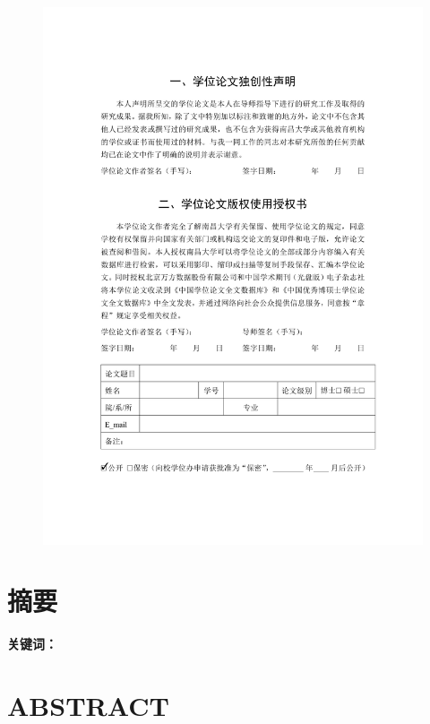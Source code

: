 \documentclass[UTF-8, a4paper, zihao=-4, no-math, openany, oneside]{ctexbook}
\begin{document}
\begin{figure}[H]
\centering
\includegraphics[width=\textwidth]{degree_thesis_declarations_authorizations}
\end{figure}

\clearpage
{}
\chapter*{摘要}

\vspace*{1ex}\noindent \textbf{关键词：}

\clearpage
{}
\chapter*{ABSTRACT}
\end{document}
